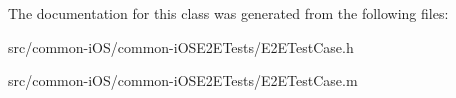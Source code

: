 The documentation for this class was generated from the following files\+:\begin{DoxyCompactItemize}
\item 
src/common-\/i\+O\+S/common-\/i\+O\+S\+E2\+E\+Tests/E2\+E\+Test\+Case.\+h\item 
src/common-\/i\+O\+S/common-\/i\+O\+S\+E2\+E\+Tests/E2\+E\+Test\+Case.\+m\end{DoxyCompactItemize}
